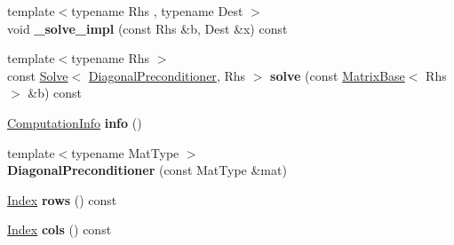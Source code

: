 \begin{DoxyCompactItemize}
\item 
\mbox{\label{group___iterative_linear_solvers___module_a3bbc5d91d64e3968c3b0b629e15e9fb7}} 
{\footnotesize template$<$typename Rhs , typename Dest $>$ }\\void {\bfseries \+\_\+solve\+\_\+impl} (const Rhs \&b, Dest \&x) const
\item 
\mbox{\label{group___iterative_linear_solvers___module_a0b42a9d87d619347f92f703f162f375f}} 
{\footnotesize template$<$typename Rhs $>$ }\\const \hyperlink{group___core___module_class_eigen_1_1_solve}{Solve}$<$ \hyperlink{group___iterative_linear_solvers___module_class_eigen_1_1_diagonal_preconditioner}{Diagonal\+Preconditioner}, Rhs $>$ {\bfseries solve} (const \hyperlink{group___core___module_class_eigen_1_1_matrix_base}{Matrix\+Base}$<$ Rhs $>$ \&b) const
\item 
\mbox{\label{group___iterative_linear_solvers___module_a83769941faa301e9f414ecdf6a715140}} 
\hyperlink{group__enums_ga85fad7b87587764e5cf6b513a9e0ee5e}{Computation\+Info} {\bfseries info} ()
\item 
\mbox{\label{group___iterative_linear_solvers___module_ad7d67c2d25072f73543031e4853d443b}} 
{\footnotesize template$<$typename Mat\+Type $>$ }\\{\bfseries Diagonal\+Preconditioner} (const Mat\+Type \&mat)
\item 
\mbox{\label{group___iterative_linear_solvers___module_abfa8fc0d88fd77c131cf0bf8a88d8c4d}} 
\hyperlink{namespace_eigen_a62e77e0933482dafde8fe197d9a2cfde}{Index} {\bfseries rows} () const
\item 
\mbox{\label{group___iterative_linear_solvers___module_ab6e72d6ba6e848c2669e7453ccbf1e2b}} 
\hyperlink{namespace_eigen_a62e77e0933482dafde8fe197d9a2cfde}{Index} {\bfseries cols} () const
\item 
\mbox{\label{group___iterative_linear_solvers___module_af9a7205f04b0ef833b3fae8b2c3f6cc9}} 

\end{DoxyCompactItemize}
